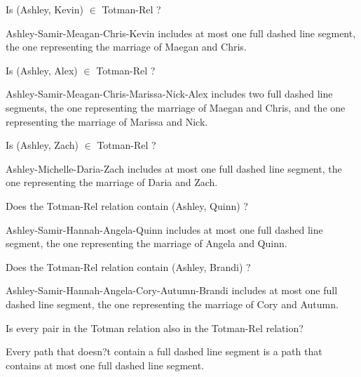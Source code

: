 \documentclass{ximera}
\begin{document}
\begin{exercise}
\begin{problem} Is (Ashley, Kevin) $\in$ Totman-Rel ?  
\begin{feedback}
Ashley-Samir-Meagan-Chris-Kevin includes at most one full dashed line segment, the one representing the marriage of Maegan and Chris.
\end{feedback}
\end{problem}

\begin{problem} Is (Ashley, Alex) $\in$ Totman-Rel ?  
\begin{feedback}
Ashley-Samir-Meagan-Chris-Marissa-Nick-Alex includes two full dashed line segments, the one representing the marriage of Maegan and Chris, and the one representing the marriage of Marissa and Nick.
\end{feedback}
\end{problem}

\begin{problem} Is (Ashley, Zach) $\in$ Totman-Rel ?  
\begin{feedback}
Ashley-Michelle-Daria-Zach includes at most one full dashed line segment, the one representing the marriage of Daria and Zach.
\end{feedback}
\end{problem}

\begin{problem} Does the Totman-Rel relation contain (Ashley, Quinn) ?  
\begin{feedback}
Ashley-Samir-Hannah-Angela-Quinn includes at most one full dashed line segment, the one representing the marriage of Angela and Quinn.
\end{feedback}
\end{problem}

\begin{problem} Does the Totman-Rel relation contain (Ashley, Brandi) ?  
\begin{feedback}
Ashley-Samir-Hannah-Angela-Cory-Autumn-Brandi includes at most one full dashed line segment, the one representing the marriage of Cory and Autumn.
\end{feedback}
\end{problem}

\begin{problem} Is every pair in the Totman relation also in the Totman-Rel relation?  
\begin{feedback}
Every path that doesn?t contain a full dashed line segment is a path that contains at most one full dashed line segment.
\end{feedback}
\end{problem}


\end{exercise}
\end{document}
